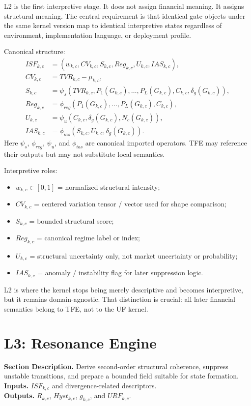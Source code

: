 \documentclass[11pt]{report}
\newcommand{\meta}[3]{\textbf{Section Description.} #1\\
\textbf{Inputs.} #2\\
\textbf{Outputs.} #3\par}
\begin{document}
L2 is the first interpretive stage. It does not assign financial meaning. It assigns structural meaning. The central requirement is that identical gate objects under the same kernel version map to identical interpretive states regardless of environment, implementation language, or deployment profile.

Canonical structure:
\begin{align*}
ISF_{k,c} &= (w_{k,c},CV_{k,c},S_{k,c},Reg_{k,c},U_{k,c},IAS_{k,c}),\\
CV_{k,c} &= TVR_{k,c}-\mu_{k,c},\\
S_{k,c} &= \psi_s\!\left(TVR_{k,c},P_1(G_{k,c}),\dots,P_L(G_{k,c}),C_{k,c},\delta_g(G_{k,c})\right),\\
Reg_{k,c} &= \phi_{reg}\!\left(P_1(G_{k,c}),\dots,P_L(G_{k,c}),C_{k,c}\right),\\
U_{k,c} &= \psi_u\!\left(C_{k,c},\delta_g(G_{k,c}),N_c(G_{k,c})\right),\\
IAS_{k,c} &= \phi_{ias}\!\left(S_{k,c},U_{k,c},\delta_g(G_{k,c})\right).
\end{align*}
Here $\psi_s$, $\phi_{reg}$, $\psi_u$, and $\phi_{ias}$ are canonical imported operators. TFE may reference their outputs but may not substitute local semantics.

Interpretive roles:
\begin{itemize}
    \item $w_{k,c}\in[0,1]$ = normalized structural intensity;
    \item $CV_{k,c}$ = centered variation tensor / vector used for shape comparison;
    \item $S_{k,c}$ = bounded structural score;
    \item $Reg_{k,c}$ = canonical regime label or index;
    \item $U_{k,c}$ = structural uncertainty only, not market uncertainty or probability;
    \item $IAS_{k,c}$ = anomaly / instability flag for later suppression logic.
\end{itemize}

L2 is where the kernel stops being merely descriptive and becomes interpretive, but it remains domain-agnostic. That distinction is crucial: all later financial semantics belong to TFE, not to the UF kernel.

\section{L3: Resonance Engine}
\meta{Derive second-order structural coherence, suppress unstable transitions, and prepare a bounded field suitable for state formation.}{$ISF_{k,c}$ and divergence-related descriptors.}{$R_{k,c}$, $Hyst_{k,c}$, $g_{k,c}$, and $URF_{k,c}$.}
\end{document}
